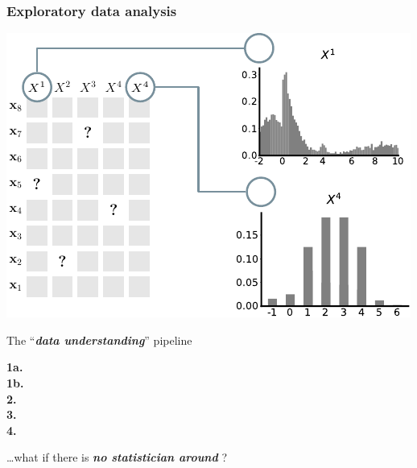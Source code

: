 \documentclass[xcolor={usenames,dvipsnames,svgnames}, compress, aspectratio=169, 11pt]{beamer}
\begin{document}
\begin{frame}[t, htt=bgrey2]
  \frametitle{Exploratory data analysis}
  \large
  \begin{minipage}[t]{0.6\linewidth}
    \vspace{5pt}
    \includegraphics[width=.9\linewidth]{figures/abda-miss-hist-type}
  \end{minipage}\hfill\begin{minipage}[t]{0.4\linewidth}
    \vspace{10pt}
    {The ``\emph{\textbf{data understanding}}'' pipeline}\\[3pt]
    \raggedleft\begin{minipage}[t]{.9\linewidth}
      {\textbf{1a.} \\[-2pt]}
      {\textbf{1b.}\hspace{0pt} \\[-2pt]}
      {\textbf{2.}\hspace{6pt} \\[-2pt]}
      {\textbf{3.}\hspace{6pt} \\[-2pt]}
      {\textbf{4.}\hspace{6pt} \\[2pt]}
    \end{minipage}
    
    {\small\ldots what if there is \emph{\textbf{no statistician around}} ?}
  \end{minipage}  
\end{frame}
\end{document}
